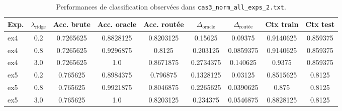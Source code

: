 \begin{table}[ht]
\centering
\small
\begin{tabular}{lcccccccc}
\hline
Exp.
&
$\lambda_{\mathrm{ridge}}$
&
Acc. brute
&
Acc. oracle
&
Acc. routée
&
$\Delta_{\mathrm{oracle}}$
&
$\Delta_{\mathrm{routée}}$
&
Ctx train
&
Ctx test
\\
\hline

ex4
&
0.2
&
0.7265625
&
0.8828125
&
0.8203125
&
0.15625
&
0.09375
&
0.9140625
&
0.859375
\\

ex4
&
0.8
&
0.7265625
&
0.9296875
&
0.8125
&
0.203125
&
0.0859375
&
0.9140625
&
0.859375
\\

ex4
&
3.0
&
0.7265625
&
1.0
&
0.8671875
&
0.2734375
&
0.140625
&
0.9375
&
0.859375
\\

\hline

ex5
&
0.2
&
0.765625
&
0.8984375
&
0.796875
&
0.1328125
&
0.03125
&
0.8515625
&
0.8125
\\

ex5
&
0.8
&
0.765625
&
0.9921875
&
0.8046875
&
0.2265625
&
0.0390625
&
0.875
&
0.8125
\\

ex5
&
3.0
&
0.765625
&
1.0
&
0.8203125
&
0.234375
&
0.0546875
&
0.8828125
&
0.8125
\\

\hline
\end{tabular}
\caption{Performances de classification observées dans
\texttt{cas3\_norm\_all\_exps\_2.txt}.}
\end{table}








